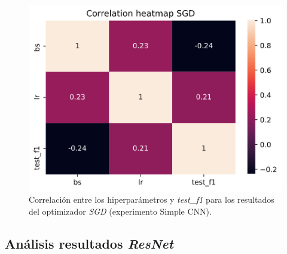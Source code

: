 \begin{figure}[H]
  \centering
  \includegraphics[width=.8\linewidth]{imagenes/06_Experimentacion/simplecnn/simplecnnsgdcorr.png}  
  \caption{Correlación entre los hiperparámetros y \textit{test\_f1} para los resultados del optimizador \textit{SGD} (experimento Simple CNN).}
  \label{fig:simplecnncorr}
\end{figure}

\subsection{Análisis resultados \textit{ResNet}}

